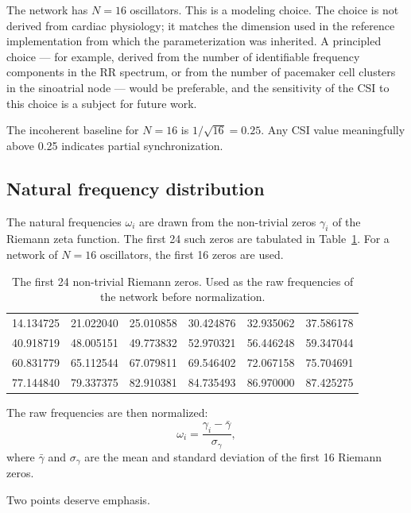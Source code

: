 \documentclass[11pt]{article}
\begin{document}
The network has $N = 16$ oscillators. This is a modeling choice. The
choice is not derived from cardiac physiology; it matches the dimension
used in the reference implementation from which the parameterization
was inherited. A principled choice --- for example, derived from the
number of identifiable frequency components in the RR spectrum, or from
the number of pacemaker cell clusters in the sinoatrial node --- would
be preferable, and the sensitivity of the CSI to this choice is a
subject for future work.

The incoherent baseline for $N = 16$ is $1/\sqrt{16} = 0.25$. Any CSI
value meaningfully above 0.25 indicates partial synchronization.

\subsection{Natural frequency distribution}

The natural frequencies $\omega_i$ are drawn from the non-trivial zeros
$\gamma_i$ of the Riemann zeta function. The first 24 such zeros are
tabulated in Table~\ref{tab:zeros}. For a network of $N = 16$
oscillators, the first 16 zeros are used.

\begin{table}[h]
\centering
\small
\begin{tabular}{llllll}
\toprule
14.134725 & 21.022040 & 25.010858 & 30.424876 & 32.935062 & 37.586178 \\
40.918719 & 48.005151 & 49.773832 & 52.970321 & 56.446248 & 59.347044 \\
60.831779 & 65.112544 & 67.079811 & 69.546402 & 72.067158 & 75.704691 \\
77.144840 & 79.337375 & 82.910381 & 84.735493 & 86.970000 & 87.425275 \\
\bottomrule
\end{tabular}
\caption{The first 24 non-trivial Riemann zeros. Used as the raw
frequencies of the network before normalization.}
\label{tab:zeros}
\end{table}

The raw frequencies are then normalized:
\begin{equation}
\omega_i = \frac{\gamma_i - \bar\gamma}{\sigma_\gamma},
\label{eq:normalization}
\end{equation}
where $\bar\gamma$ and $\sigma_\gamma$ are the mean and standard
deviation of the first 16 Riemann zeros.

Two points deserve emphasis.
\end{document}
